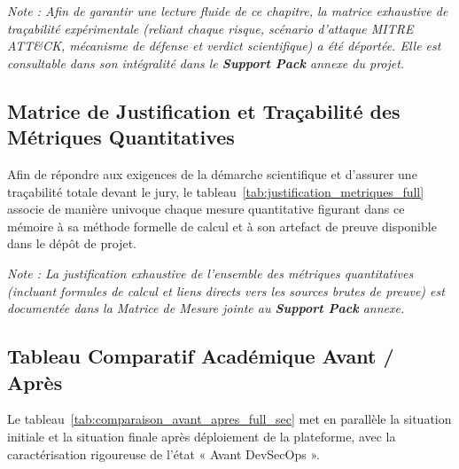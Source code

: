 \textit{Note : Afin de garantir une lecture fluide de ce chapitre, la matrice exhaustive de traçabilité expérimentale (reliant chaque risque, scénario d'attaque MITRE ATT\&CK, mécanisme de défense et verdict scientifique) a été déportée. Elle est consultable dans son intégralité dans le \textbf{Support Pack} annexe du projet.}


\subsection{Matrice de Justification et Traçabilité des Métriques Quantitatives}

Afin de répondre aux exigences de la démarche scientifique et d'assurer une traçabilité totale devant le jury, le tableau~\ref{tab:justification_metriques_full} associe de manière univoque chaque mesure quantitative figurant dans ce mémoire à sa méthode formelle de calcul et à son artefact de preuve disponible dans le dépôt de projet.

\textit{Note : La justification exhaustive de l'ensemble des métriques quantitatives (incluant formules de calcul et liens directs vers les sources brutes de preuve) est documentée dans la Matrice de Mesure jointe au \textbf{Support Pack} annexe.}


\subsection{Tableau Comparatif Académique Avant / Après}

Le tableau~\ref{tab:comparaison_avant_apres_full_sec} met en parallèle la situation initiale et la situation finale après déploiement de la plateforme, avec la caractérisation rigoureuse de l'état « Avant DevSecOps ».

